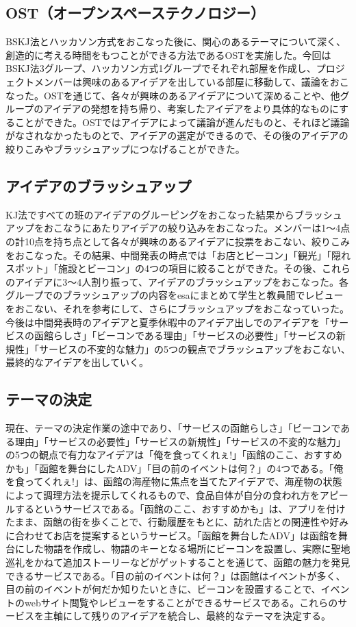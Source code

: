 \subsection{OST（オープンスペーステクノロジー）}
BSKJ法とハッカソン方式をおこなった後に、関心のあるテーマについて深く、創造的に考える時間をもつことができる方法であるOSTを実施した。今回はBSKJ法3グループ、ハッカソン方式1グループでそれぞれ部屋を作成し、プロジェクトメンバーは興味のあるアイデアを出している部屋に移動して、議論をおこなった。OSTを通じて、各々が興味のあるアイデアについて深めることや、他グループのアイデアの発想を持ち帰り、考案したアイデアをより具体的なものにすることができた。OSTではアイデアによって議論が進んだものと、それほど議論がなされなかったものとで、アイデアの選定ができるので、その後のアイデアの絞りこみやブラッシュアップにつなげることができた。

\subsection{アイデアのブラッシュアップ}
KJ法ですべての班のアイデアのグルーピングをおこなった結果からブラッシュアップをおこなうにあたりアイデアの絞り込みをおこなった。メンバーは1～4点の計10点を持ち点として各々が興味のあるアイデアに投票をおこない、絞りこみをおこなった。その結果、中間発表の時点では「お店とビーコン」「観光」「隠れスポット」「施設とビーコン」の4つの項目に絞ることができた。その後、これらのアイデアに3～4人割り振って、アイデアのブラッシュアップをおこなった。各グループでのブラッシュアップの内容をesaにまとめて学生と教員間でレビューをおこない、それを参考にして、さらにブラッシュアップをおこなっていった。今後は中間発表時のアイデアと夏季休暇中のアイデア出しでのアイデアを「サービスの函館らしさ」「ビーコンである理由」「サービスの必要性」「サービスの新規性」「サービスの不変的な魅力」の5つの観点でブラッシュアップをおこない、最終的なアイデアを出していく。

\subsection{テーマの決定}
現在、テーマの決定作業の途中であり、「サービスの函館らしさ」「ビーコンである理由」「サービスの必要性」「サービスの新規性」「サービスの不変的な魅力」の5つの観点で有力なアイデアは「俺を食ってくれぇ!」「函館のここ、おすすめかも」「函館を舞台にしたADV」「目の前のイベントは何？」の4つである。「俺を食ってくれぇ!」は、函館の海産物に焦点を当てたアイデアで、海産物の状態によって調理方法を提示してくれるもので、食品自体が自分の食われ方をアピールするというサービスである。「函館のここ、おすすめかも」は、アプリを付けたまま、函館の街を歩くことで、行動履歴をもとに、訪れた店との関連性や好みに合わせてお店を提案するというサービス。「函館を舞台したADV」は函館を舞台にした物語を作成し、物語のキーとなる場所にビーコンを設置し、実際に聖地巡礼をかねて追加ストーリーなどがゲットすることを通じて、函館の魅力を発見できるサービスである。「目の前のイベントは何？」は函館はイベントが多く、目の前のイベントが何だか知りたいときに、ビーコンを設置することで、イベントのwebサイト閲覧やレビューをすることができるサービスである。これらのサービスを主軸にして残りのアイデアを統合し、最終的なテーマを決定する。


